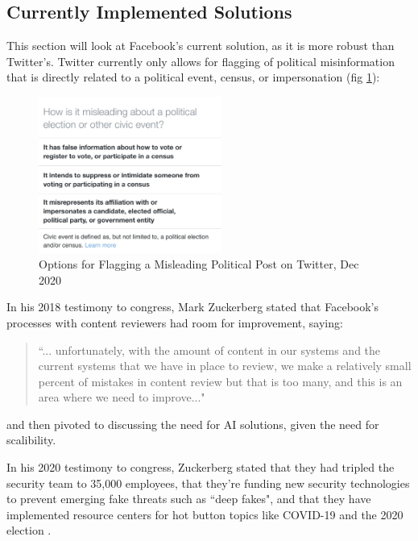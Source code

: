 \documentclass[preprint,review,12pt]{elsarticle}
\begin{document}
\subsection{Currently Implemented Solutions}
\label{sec: currently implemented solutions}
This section will look at Facebook's current solution, as it is more robust than Twitter's. Twitter currently only allows for flagging of political misinformation that is directly related to a political event, census, or impersonation (fig \ref{img:TwitterPolitics}):
\begin{figure}[htp]
    \centering
    \includegraphics[width=6cm]{TwitterPolitics.jpg}
    \caption{Options for Flagging a Misleading Political Post on Twitter, Dec 2020}
    \label{img:TwitterPolitics}
\end{figure}

In his 2018 testimony to congress, Mark Zuckerberg stated that Facebook's processes with content reviewers had room for improvement, saying: \begin{quote}``... unfortunately, with the amount of content in our systems and the current systems that we have in place to review, we make a relatively small percent of mistakes in content review but that is too many, and this is an area where we need to improve..." \cite{energy2018facebook}\end{quote} and then pivoted to discussing the need for AI solutions, given the need for scalibility.

In his 2020 testimony to congress, Zuckerberg stated that they had tripled the security team to 35,000 employees, that they're funding new security technologies to prevent emerging fake threats such as ``deep fakes", and that they have implemented resource centers for hot button topics like COVID-19 and the 2020 election \cite{zuckerberg2020}.
\end{document}

